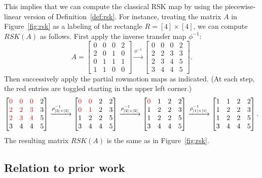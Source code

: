 \documentclass[ALCO,Unicode,published]{cedram}
\numberwithin{equation}{section}
\newcommand{\red}[1]{\textcolor{red}{#1}}
\begin{document}
\begin{Ex}
    This implies that we can compute the classical RSK map by using the piecewise-linear version of Definition~\ref{def:rsk}. For instance,
    treating the matrix $A$ in Figure~\ref{fig:rsk} as a labeling of the rectangle $R=[4] \times [4]$, we can compute $RSK(A)$ as follows. First apply the inverse transfer map $\phi^{-1}$:
    \[A=\begin{bmatrix}0&0&0&2\\2&0&1&0\\0&1&1&1\\1&1&0&0\end{bmatrix} \xrightarrow{\phi^{-1}} \begin{bmatrix}0&0&0&2\\2&2&3&3\\2&3&4&5\\3&4&4&5\end{bmatrix}.\]
    Then successively apply the partial rowmotion maps as indicated. (At each step, the red entries are toggled starting in the upper left corner.)
    \[\begin{bmatrix}\red0&\red0&\red0&2\\\red2&\red2&\red3&3\\\red2&\red3&\red4&5\\3&4&4&5\end{bmatrix}
    \xrightarrow{\rho_{[3] \times [3]}^{-1}} \begin{bmatrix}\red0&\red0&2&2\\\red0&\red1&2&3\\1&2&2&5\\3&4&4&5\end{bmatrix}
    \xrightarrow{\rho_{[2] \times [2]}^{-1}} \begin{bmatrix}\red0&1&2&2\\1&2&2&3\\1&2&2&5\\3&4&4&5\end{bmatrix}
    \xrightarrow{\rho_{[1] \times [1]}^{-1}} \begin{bmatrix}1&1&2&2\\1&2&2&3\\1&2&2&5\\3&4&4&5\end{bmatrix}.
    \]
    The resulting matrix $RSK(A)$ is the same as in Figure~\ref{fig:rsk}.
\end{Ex}

\subsection{Relation to prior work}
\end{document}
